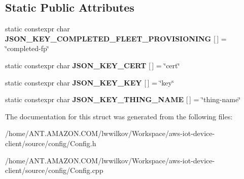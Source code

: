 \subsection*{Static Public Attributes}
\begin{DoxyCompactItemize}
\item 
\mbox{\label{struct_aws_1_1_iot_1_1_device_client_1_1_plain_config_1_1_fleet_provisioning_runtime_config_ac0349fbd3e9674b200f2ad12b72b99c9}} 
static constexpr char {\bfseries J\+S\+O\+N\+\_\+\+K\+E\+Y\+\_\+\+C\+O\+M\+P\+L\+E\+T\+E\+D\+\_\+\+F\+L\+E\+E\+T\+\_\+\+P\+R\+O\+V\+I\+S\+I\+O\+N\+I\+NG} \mbox{[}$\,$\mbox{]} = \char`\"{}completed-\/fp\char`\"{}
\item 
\mbox{\label{struct_aws_1_1_iot_1_1_device_client_1_1_plain_config_1_1_fleet_provisioning_runtime_config_a75abbf312bb769b69e9d921e7f018027}} 
static constexpr char {\bfseries J\+S\+O\+N\+\_\+\+K\+E\+Y\+\_\+\+C\+E\+RT} \mbox{[}$\,$\mbox{]} = \char`\"{}cert\char`\"{}
\item 
\mbox{\label{struct_aws_1_1_iot_1_1_device_client_1_1_plain_config_1_1_fleet_provisioning_runtime_config_a9936969e5d2ad49ee0c7950cf765abcb}} 
static constexpr char {\bfseries J\+S\+O\+N\+\_\+\+K\+E\+Y\+\_\+\+K\+EY} \mbox{[}$\,$\mbox{]} = \char`\"{}key\char`\"{}
\item 
\mbox{\label{struct_aws_1_1_iot_1_1_device_client_1_1_plain_config_1_1_fleet_provisioning_runtime_config_a0f9b8beba633c2ce59f50f043bbe71c6}} 
static constexpr char {\bfseries J\+S\+O\+N\+\_\+\+K\+E\+Y\+\_\+\+T\+H\+I\+N\+G\+\_\+\+N\+A\+ME} \mbox{[}$\,$\mbox{]} = \char`\"{}thing-\/name\char`\"{}
\end{DoxyCompactItemize}


The documentation for this struct was generated from the following files\+:\begin{DoxyCompactItemize}
\item 
/home/\+A\+N\+T.\+A\+M\+A\+Z\+O\+N.\+C\+O\+M/lwwilkov/\+Workspace/aws-\/iot-\/device-\/client/source/config/Config.\+h\item 
/home/\+A\+N\+T.\+A\+M\+A\+Z\+O\+N.\+C\+O\+M/lwwilkov/\+Workspace/aws-\/iot-\/device-\/client/source/config/Config.\+cpp\end{DoxyCompactItemize}
